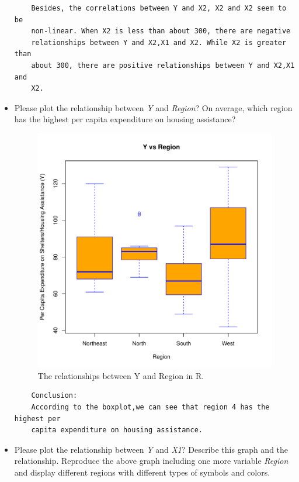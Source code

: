 \documentclass[12pt,letterpaper]{article}
\begin{document}
\begin{itemize}
\begin{verbatim}
	Besides, the correlations between Y and X2, X2 and X2 seem to be 
	non-linear. When X2 is less than about 300, there are negative 
	relationships between Y and X2,X1 and X2. While X2 is greater than 
	about 300, there are positive relationships between Y and X2,X1 and 
	X2.\end{verbatim}
\item
Please plot the relationship between \emph{Y} and \emph{Region}? On average, which region has the highest per capita expenditure on housing assistance?
\vspace{.5cm}
	  

	\begin{figure}[h!]\centering
	\caption{\footnotesize The relationships between Y and Region in R.}
	\label{fig:plot_2}
	\includegraphics[width=.85\textwidth]{Problem2_Question2_BoxPlot.pdf}
		\end{figure}
		
\newpage

	\begin{verbatim}
	Conclusion:
	According to the boxplot,we can see that region 4 has the highest per 
	capita expenditure on housing assistance.
	\end{verbatim}

\item
Please plot the relationship between \emph{Y} and \emph{X1}? Describe this graph and the relationship. Reproduce the above graph including one more variable \emph{Region} and display different regions with different types of symbols and colors.
\vspace{.5cm}


\end{itemize}
\end{document}
